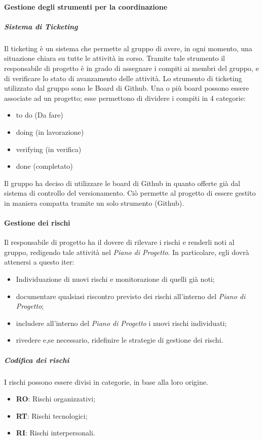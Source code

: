 			
			\paragraph{Gestione degli strumenti per la coordinazione}
			
				\subparagraph{Sistema di Ticketing}
				Il ticketing è un sistema che permette al gruppo di avere, in ogni momento, una situazione chiara su tutte le attività in corso. Tramite tale strumento il responsabile di progetto è in grado di assegnare i compiti ai membri del gruppo, e di verificare lo stato di avanzamento delle attività. Lo strumento di ticketing utilizzato dal gruppo sono le Board di Github. Una o più board possono essere associate ad un progetto; esse permettono di dividere i compiti in 4 categorie:
					\begin{itemize}
						\item to do (Da fare)
						\item doing (in lavorazione)
						\item verifying (in verifica)
						\item done (completato)
					\end{itemize}
				Il gruppo ha deciso di utilizzare le board di Github in quanto offerte già dal sistema di controllo del versionamento. Ciò permette al progetto di essere gestito in maniera compatta tramite un solo strumento (Github).
			
			
			\paragraph{Gestione dei rischi}
			Il responsabile di progetto ha il dovere di rilevare i rischi e renderli noti al gruppo, redigendo tale attività nel \textit{Piano di Progetto}. In particolare, egli dovrà attenersi a questo iter:
			\begin{itemize}
				\item Individuazione di nuovi rischi e monitorazione di quelli già noti;
				\item documentare qualsiasi riscontro previsto dei rischi all'interno del \textit{Piano di Progetto};
				\item includere all'interno del \textit{Piano di Progetto} i nuovi rischi individuati;
				\item rivedere e,se necessario, ridefinire le strategie di gestione dei rischi.
			\end{itemize}
			
				\subparagraph{Codifica dei rischi}
				I rischi possono essere divisi in categorie, in base alla loro origine.
				\begin{itemize}
					\item \textbf{RO}: Rischi organizzativi;
					\item \textbf{RT}: Rischi tecnologici;
					\item \textbf{RI}: Rischi interpersonali.	
				\end{itemize}
			
